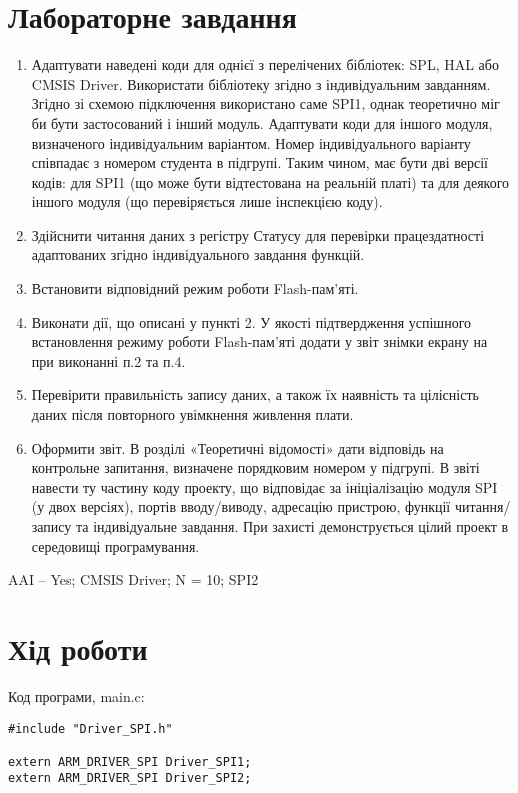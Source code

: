 \documentclass[oneside,14pt]{extarticle}
\begin{document}
\begin{normalsize}
  \section*{Лабораторне завдання}
  \begin{enumerate}
  	\item Адаптувати наведені коди для однієї з перелічених бібліотек: SPL, HAL або
CMSIS Driver. Використати бібліотеку згідно з індивідуальним завданням.
Згідно зі схемою підключення використано саме SPI1, однак теоретично міг
би бути застосований і інший модуль. Адаптувати коди для іншого модуля,
визначеного індивідуальним варіантом. Номер індивідуального варіанту
співпадає з номером студента в підгрупі. Таким чином, має бути дві версії
кодів: для SPI1 (що може бути відтестована на реальній платі) та для
деякого іншого модуля (що перевіряється лише інспекцією коду).
  \item Здійснити читання даних з регістру Статусу для перевірки працездатності
адаптованих згідно індивідуального завдання функцій.
  \item Встановити відповідний режим роботи Flash-пам'яті.
  \item Виконати дії, що описані у пункті 2. У якості підтвердження успішного
встановлення режиму роботи Flash-пам'яті додати у звіт знімки екрану на
при виконанні п.2 та п.4.
  \item Перевірити правильність запису даних, а також їх наявність та цілісність
даних після повторного увімкнення живлення плати.
  \item Оформити звіт. В розділі «Теоретичні відомості» дати відповідь на
контрольне запитання, визначене порядковим номером у підгрупі. В звіті
навести ту частину коду проекту, що відповідає за ініціалізацію модуля SPI
(у двох версіях), портів вводу/виводу, адресацію пристрою, функції
читання/запису та індивідуальне завдання. При захисті демонструється
цілий проект в середовищі програмування.
  \end{enumerate}
  
  AAI – Yes; CMSIS Driver; N = 10; SPI2
  
  \section*{Хід роботи}
  
  Код програми, main.c:
  
	{\small\begin{lstlisting}
#include "Driver_SPI.h"

extern ARM_DRIVER_SPI Driver_SPI1;
extern ARM_DRIVER_SPI Driver_SPI2;


\end{lstlisting}}
\end{normalsize}
\end{document}
